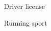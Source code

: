 

\begin{cventries}

  \cventry
    {
      \begin{cvitems} %
        \item {Driver license}
        \item {Running sport}
      \end{cvitems}
    }

\end{cventries}
